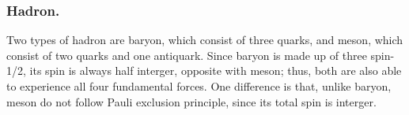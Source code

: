 \documentclass[../../../main.tex]{subfiles}
\begin{document}
\subsubsection*{Hadron.} Two types of hadron are baryon, which consist of three quarks, and meson, which consist of two quarks and one antiquark. Since baryon is made up of three spin-1/2, its spin is always half interger, opposite with meson; thus, both are also able to experience all four fundamental forces. One difference is that, unlike baryon, meson do not follow Pauli exclusion principle, since its total spin is interger.

\end{document}
